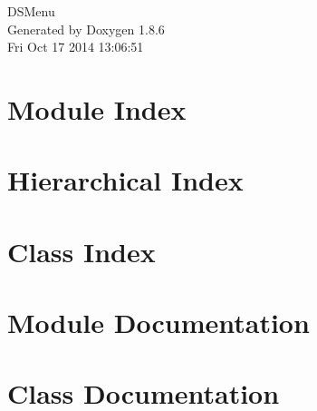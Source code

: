 \documentclass[twoside]{book}
\newcommand{\clearemptydoublepage}{%
  \newpage{\pagestyle{empty}\cleardoublepage}%
}
\begin{document}
\hypersetup{pageanchor=false}
\begin{titlepage}
\vspace*{7cm}
\begin{center}%
{\Large D\-S\-Menu }\\
\vspace*{1cm}
{\large Generated by Doxygen 1.8.6}\\
\vspace*{0.5cm}
{\small Fri Oct 17 2014 13:06:51}\\
\end{center}
\end{titlepage}
\clearemptydoublepage
\tableofcontents
\clearemptydoublepage
{}
\hypersetup{pageanchor=true}

\chapter{Module Index}

\chapter{Hierarchical Index}

\chapter{Class Index}

\chapter{Module Documentation}



\chapter{Class Documentation}
























\newpage
{}
{}
\printindex
\end{document}
